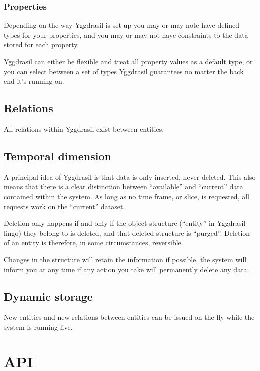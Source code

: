 \documentclass[english,a4paper]{article}
\begin{document}
\subsubsection{Properties}

Depending on the way Yggdrasil is set up you may or may note have
defined types for your properties, and you may or may not have
constraints to the data stored for each property.  

Yggdrasil can either be flexible and treat all property values as a
default type, or you can select between a set of types Yggdrasil
guarantees no matter the back end it's running on.

\subsection{Relations}

All relations within Yggdrasil exist between entities.  
 
\subsection{Temporal dimension}

A principal idea of Yggdrasil is that data is only inserted, never
deleted.  This also means that there is a clear distinction between
``available'' and ``current'' data contained within the system.
As long as no time frame, or slice, is requested, all requests work on
the ``current'' dataset. 

Deletion only happens if and only if the object structure (``entity''
in Yggdrasil lingo) they belong to is deleted, and that deleted
structure is ``purged''.  Deletion of an entity is therefore, in some
circumstances, reversible.

Changes in the structure will retain the information if possible, the
system will inform you at any time if any action you take will
permanently delete any data.

\subsection{Dynamic storage}

New entities and new relations between entities can be issued on the
fly while the system is running live.  

\section{API}
\end{document}
